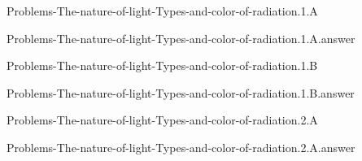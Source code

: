 \documentclass[main.tex]{subfiles}
\newcommand\chapterlabel{}
\begin{document}
\renewcommand\chapterlabel{Ch-radiation}
\begin{question}[ID=\the\value{numA}]
{Problems-The-nature-of-light-Types-and-color-of-radiation.1.A}
\end{question}
   \begin{Form}
   \TextField[multiline,backgroundcolor=gray!20,borderwidth=0,width=0.43\textwidth  ,height=115pt, name=\the\value{numA}]  { }\end{Form}
\begin{solution}
{Problems-The-nature-of-light-Types-and-color-of-radiation.1.A.answer}
\hspace{0.1cm}
\end{solution}


\renewcommand\chapterlabel{Ch-radiation}
\begin{question}[ID=\the\value{numA}]
{Problems-The-nature-of-light-Types-and-color-of-radiation.1.B}
\end{question}
   \begin{Form}
   \TextField[multiline,backgroundcolor=gray!20,borderwidth=0,width=0.43\textwidth  ,height=115pt, name=\the\value{numA}]  { }\end{Form}
\begin{solution}
{Problems-The-nature-of-light-Types-and-color-of-radiation.1.B.answer}
\hspace{0.1cm}
\end{solution}


\renewcommand\chapterlabel{Ch-radiation}
\begin{question}[ID=\the\value{numA}]
{Problems-The-nature-of-light-Types-and-color-of-radiation.2.A}
\end{question}
   \begin{Form}
   \TextField[multiline,backgroundcolor=gray!20,borderwidth=0,width=0.43\textwidth  ,height=115pt, name=\the\value{numA}]  { }\end{Form}
\begin{solution}
{Problems-The-nature-of-light-Types-and-color-of-radiation.2.A.answer}
\hspace{0.1cm}
\end{solution}
\end{document}
